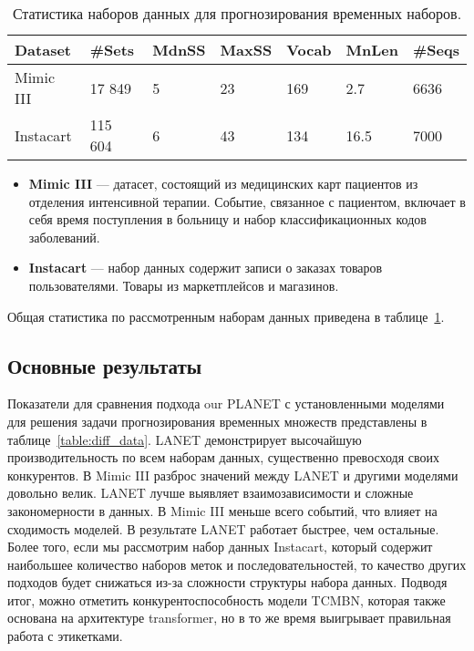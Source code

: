\documentclass[a4paper, 12pt]{article} %
\begin{document}
\begin{table}[ht!] 
\centering
\caption{Статистика наборов данных для прогнозирования временных наборов.}
\vspace{2pt}
\begin{tabular}{p{1.3cm}p{1.2cm}p{0.8cm}p{0.8cm}p{0.8cm}p{1.0cm}p{0.73cm}}
\hline
Dataset & \#Sets & MdnSS & MaxSS & Vocab & MnLen & \#Seqs  \\
\hline  
Mimic III & 17 849 & 5 & 23  & 169 & 2.7 & 6636 \\ 
Instacart & 115 604 & 6 & 43  & 134 & 16.5 & 7000 \\
\hline
\end{tabular}
\label{tab:multi_datasets}
\end{table}

\begin{itemize}
    \item \textbf{Mimic III} --- датасет, состоящий из медицинских карт пациентов из отделения интенсивной терапии. Событие, связанное с пациентом, включает в себя время поступления в больницу и набор классификационных кодов заболеваний.
    \item \textbf{Instacart} --- набор данных содержит записи о заказах товаров пользователями. Товары из маркетплейсов и магазинов.
\end{itemize}

Общая статистика по рассмотренным наборам данных приведена в таблице~\ref{tab:multi_datasets}.

 

\subsection{Основные результаты}
Показатели для сравнения подхода our PLANET с установленными моделями для решения задачи прогнозирования временных множеств представлены в таблице~\ref{table:diff_data}. LANET демонстрирует высочайшую производительность по всем наборам данных, существенно превосходя своих конкурентов. В Mimic III разброс значений между LANET и другими моделями довольно велик. LANET лучше выявляет взаимозависимости и сложные закономерности в данных. В Mimic III меньше всего событий, что влияет на сходимость моделей. В результате LANET работает быстрее, чем остальные. Более того, если мы рассмотрим набор данных Instacart, который содержит наибольшее количество наборов меток и последовательностей, то качество других подходов будет снижаться из-за сложности структуры набора данных. Подводя итог, можно отметить конкурентоспособность модели TCMBN, которая также основана на архитектуре transformer, но в то же время выигрывает правильная работа с этикетками.  
\end{document}
